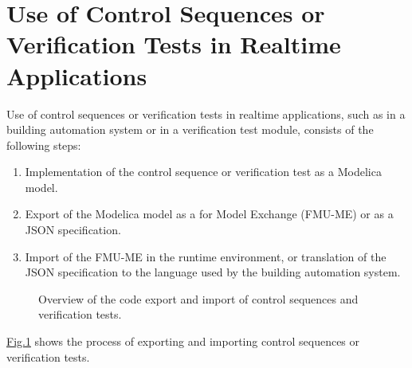 \documentclass[letterpaper,10pt, openany,english]{sphinxmanual}
\let\sphinxpxdimen\pdfpxdimen\else\newdimen\sphinxpxdimen
\begin{document}
\section{Use of Control Sequences or Verification Tests in Realtime Applications}
\label{\detokenize{codeGeneration:use-of-control-sequences-or-verification-tests-in-realtime-applications}}
Use of control sequences or verification tests in realtime applications, such
as in a building automation system or in a verification test module, consists
of the following steps:
\begin{enumerate}
\def\theenumi{\arabic{enumi}}
\def\labelenumi{\theenumi .}
\makeatletter\def\p@enumii{\p@enumi \theenumi .}\makeatother
\item {} 
Implementation of the control sequence or verification test as a Modelica model.

\item {} 
Export of the Modelica model as a {\hyperref[\detokenize{glossary:term-functional-mockup-unit}]{}} for Model Exchange (FMU-ME)
or as a JSON specification.

\item {} 
Import of the FMU-ME in the runtime environment, or translation of the
JSON specification to the language used by the building automation system.

\end{enumerate}

\begin{figure}[htbp]
\centering
\capstart

\noindent\sphinxincludegraphics[width=700\sphinxpxdimen]{{codeExport}.pdf}
\caption{Overview of the code export and import of control sequences and verification
tests.}\label{\detokenize{codeGeneration:id3}}\label{\detokenize{codeGeneration:fig-cod-exp}}\end{figure}

\hyperref[\detokenize{codeGeneration:fig-cod-exp}]{Fig.\@ \ref{\detokenize{codeGeneration:fig-cod-exp}}} shows the process of exporting and importing
control sequences or verification tests.
\end{document}
